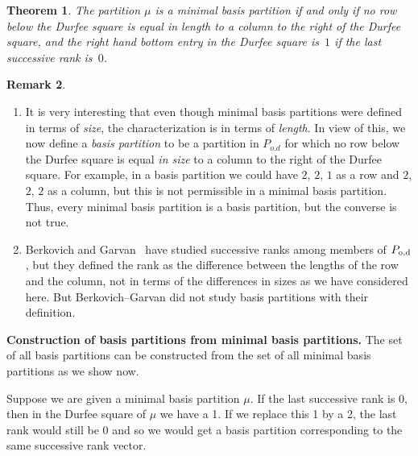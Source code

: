 \documentclass[10pt,a4paper]{amsart}
\numberwithin{equation}{section}
\newtheorem{Theorem}{Theorem}[section]
\theoremstyle{definition}
\newtheorem{Remark}[Theorem]{Remark}
\begin{document}
\begin{Theorem}%
The partition $\mu$ is a minimal basis partition if and only if
no row below the Durfee square is equal in length
to a column to the right of the Durfee square, and the right hand
bottom entry in the Durfee square is~$1$ if the last successive rank is~$0$.
\end{Theorem}

\begin{Remark}\quad
\begin{enumerate}\itemsep=0pt
\item[$(1)$] It is very interesting that even though minimal basis
partitions were defined in terms of {\it size}, the characterization is
in terms of {\it length}. In view of this, we now define a
{\it basis partition} to be a partition in $P_{o.d}$ for which no row
below the Durfee square is equal \textit{in size} to a column to the right of
the Durfee square. For example, in a basis partition we could have
$2$, $2$, $1$ as a row and $2$, $2$, $2$ as a column, but this is not permissible in a minimal
basis partition. Thus, every minimal basis partition is a basis partition, but
the converse is not true.

\item[$(2)$] Berkovich and Garvan~\cite{Be-Ga02} have studied successive ranks among members of $P_{\rm o,d}$, but they defined the rank as the difference between the lengths of the row and the column, not in terms of the differences in sizes as we have considered here. But Berkovich--Garvan did not study basis partitions with their definition.
\end{enumerate}
\end{Remark}


{\bf Construction of basis partitions from minimal basis
partitions.}
The set of all basis partitions can be constructed from the set of all
minimal basis partitions as we show now.

Suppose we are given a minimal basis partition $\mu$. If the last successive
rank is 0, then in the Durfee square of $\mu$ we have a 1. If we replace
this 1 by a 2, the last rank would still be 0 and so we would get a basis
partition corresponding to the same successive rank vector.
\end{document}
